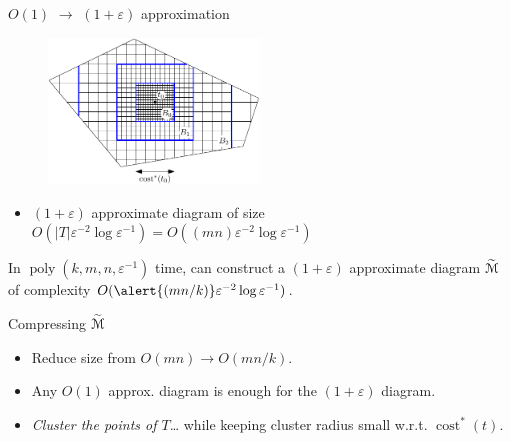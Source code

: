 \documentclass[xcolor={dvipsnames,usenames}]{beamer}
\newcommand{\eps}{\varepsilon}
\DeclareMathOperator{\poly}{poly}
\def\abs#1{\mathopen| #1 \mathclose|}		%
\DeclareMathOperator{\cost}{cost}
\newcommand{\tildeM}{\widetilde{\EuScript{M}}}
\def\EMPH#1{\textcolor{BrickRed}{{\emph{#1}}}}
\begin{document}
\begin{frame}{$O(1)$ $\rightarrow$ $(1+\eps)$ approximation}
\begin{figure}
\begin{center}
\includegraphics[width=0.5\textwidth,page=1]{nested-grid-crop}%
\end{center}
\end{figure}
\begin{itemize}
\item $(1+\eps)$ approximate diagram of size
	$O(\abs{T}\eps^{-2}\log\eps^{-1}) = O((mn)\eps^{-2}\log\eps^{-1})$
\end{itemize}
\pause
\begin{theorem}
In $\poly(k, m, n, \eps^{-1})$ time, can construct a $(1+\eps)$ approximate
diagram $\tildeM$ of complexity $O(\alert{(mn/k)}\eps^{-2}\log\eps^{-1})$.
\end{theorem}
\end{frame}

\begin{frame}{Compressing $\tildeM$}
\begin{itemize}
\item Reduce size from $O(mn) \rightarrow O(mn/k)$.
\item Any $O(1)$ approx. diagram is enough for the $(1+\eps)$ diagram.
\item \EMPH{Cluster the points of $T$}\ldots
	while keeping cluster radius small w.r.t. $\cost^*(t)$.
\end{itemize}
\end{frame}
\end{document}
